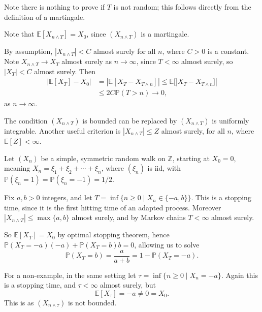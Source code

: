 \documentclass[12pt]{article}
\begin{document}
Note there is nothing to prove if $T$ is not random; this follows directly from the definition of a martingale.

\begin{proofbox}
	Note that $\mathbb{E}[X_{n \wedge T}] = X_0$, since $(X_{n \wedge T})$ is a martingale.

	By assumption, $|X_{n \wedge T}| < C$ almost surely for all $n$, where $C > 0$ is a constant. Note $X_{n \wedge T} \to X_T$ almost surely as $n \to \infty$, since $T < \infty$ almost surely, so $|X_T| < C$ almost surely. Then
	\begin{align*}
		|\mathbb{E}[X_T] - X_0| &= |\mathbb{E}[X_T - X_{T \wedge n}]| \leq \mathbb{E}[|X_T - X_{T \wedge n}]| \\
					&\leq 2C \mathbb{P}(T > n) \to 0,
	\end{align*}
	as $n \to \infty$.
\end{proofbox}

\begin{remark}
	The condition $(X_{n \wedge T})$ is bounded can be replaced by $(X_{n \wedge T})$ is uniformly integrable. Another useful criterion is $|X_{n \wedge T}| \leq Z$ almost surely, for all $n$, where $\mathbb{E}[Z] < \infty$.
\end{remark}

\begin{exbox}
	Let $(X_n)$ be a simple, symmetric random walk on $\mathbb{Z}$, starting at $X_0 = 0$, meaning $X_n = \xi_1 + \xi_2 + \cdots + \xi_n$, where $(\xi_n)$ is iid, with $\mathbb{P}(\xi_n = 1) = \mathbb{P}(\xi_n = -1) = 1/2$.

	Fix $a, b > 0$ integers, and let $T = \inf\{n \geq 0 \mid X_n \in \{-a, b\}\}$. This is a stopping time, since it is the first hitting time of an adapted process. Moreover $|X_{n \wedge T}| \leq \max\{a, b\}$ almost surely, and by Markov chains $T < \infty$ almost surely.

	So $\mathbb{E}[X_T] = X_0$ by optimal stopping theorem, hence $\mathbb{P}(X_T = -a)(-a) + \mathbb{P}(X_T = b) b = 0$, allowing us to solve
	\[
	\mathbb{P}(X_T = b) = \frac{a}{a + b} = 1 - \mathbb{P}(X_T = -a).
	\]

	For a non-example, in the same setting let $\tau = \inf\{n \geq 0 \mid X_n = -a\}$. Again this is a stopping time, and $\tau < \infty$ almost surely, but
	\[
	\mathbb{E}[X_\tau] = -a \neq 0 = X_0.
	\]
	This is as $(X_{n \wedge \tau})$ is not bounded.
\end{exbox}
\end{document}

